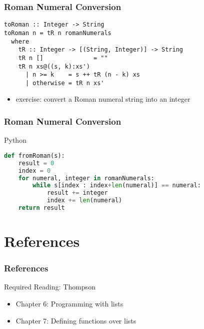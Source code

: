 \documentclass[dvipsnames]{beamer}
\theoremstyle{plain}
\begin{document}
\begin{frame}[fragile]
  \frametitle{Roman Numeral Conversion}

  \begin{exampleblock}{}
    \begin{lstlisting}
toRoman :: Integer -> String
toRoman n = tR n romanNumerals
  where
    tR :: Integer -> [(String, Integer)] -> String
    tR n []              = ""
    tR n xs@((s, k):xs')
      | n >= k    = s ++ tR (n - k) xs
      | otherwise = tR n xs'
    \end{lstlisting}
  \end{exampleblock}

  \pause
  \begin{itemize}
    \item exercise: convert a Roman numeral string into an integer
  \end{itemize}
\end{frame}

\begin{frame}[fragile]
  \frametitle{Roman Numeral Conversion}

  \begin{exampleblock}{Python}
    \begin{lstlisting}[language=Python]
def fromRoman(s):
    result = 0
    index = 0
    for numeral, integer in romanNumerals:
        while s[index : index+len(numeral)] == numeral:
            result += integer
            index += len(numeral)
    return result
    \end{lstlisting}
  \end{exampleblock}
\end{frame}

\section*{References}

\begin{frame}
  \frametitle{References}

  \begin{block}{Required Reading: Thompson}
    \begin{itemize}
      \item Chapter 6: \alert{Programming with lists}
      \item Chapter 7: \alert{Defining functions over lists}
    \end{itemize}
  \end{block}
\end{frame}
\end{document}
